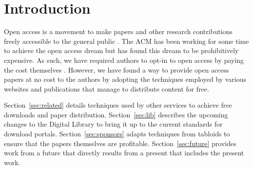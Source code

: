 \section{Introduction}
Open access is a movement to make papers and other research contributions
freely accessible to the general public \cite{oa}.
The ACM has been working for some time to achieve the open access dream but
has found this dream to be prohibitively expensive.
As such, we have required authors to opt-in to open access by paying the cost
themselves \cite{auth}.
However, we have found a way to provide open access papers at no cost to the
authors by adopting the techniques employed by various websites and
publications that manage to distribute content for free.

Section~\ref{sec:related} details techniques used by other services to achieve
free downloads and paper distribution.
Section~\ref{sec:lib} describes the upcoming changes to the Digital Library to
bring it up to the current standards for download portals.
Section~\ref{sec:sponsors} adapts techniques from tabloids to ensure that
the papers themselves are profitable.
Section~\ref{sec:future} provides work from a future that directly results from
a present that includes the present work.

